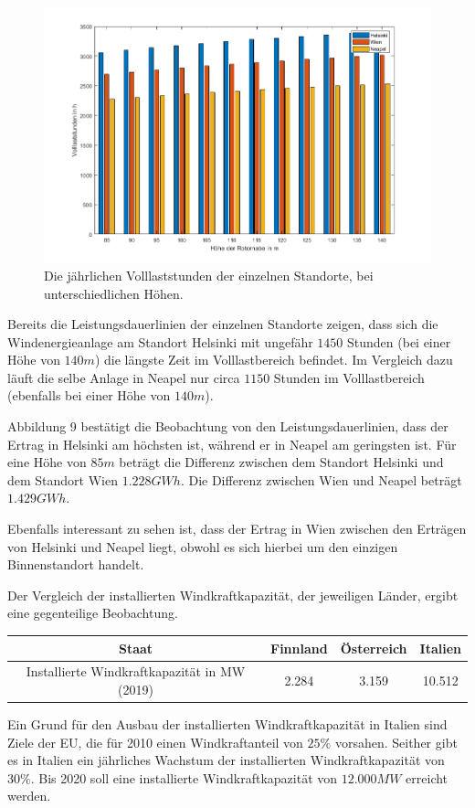 \documentclass[a4paper,12pt]{article}
\begin{document}
	\begin{figure}[H]
		\centering
		\includegraphics[width=12cm]{img/results/VolllaststundenEuropa}
		\caption{Die jährlichen Volllaststunden der einzelnen Standorte, bei unterschiedlichen Höhen.}
	\end{figure}
	\noindent Bereits die Leistungsdauerlinien der einzelnen Standorte zeigen, dass sich die Windenergieanlage am Standort Helsinki mit ungefähr $1450$ Stunden (bei einer Höhe von $140m$) die längste Zeit im Volllastbereich befindet. Im Vergleich dazu läuft die selbe Anlage in Neapel nur circa $1150$ Stunden im Volllastbereich (ebenfalls bei einer Höhe von $140m$).\\ \par
	\noindent Abbildung 9 bestätigt die Beobachtung von den Leistungsdauerlinien, dass der Ertrag in Helsinki am höchsten ist, während er in Neapel am geringsten ist.\newline
	Für eine Höhe von $85m$ beträgt die Differenz zwischen dem Standort Helsinki und dem Standort Wien $1.228GWh$. Die Differenz zwischen Wien und Neapel beträgt $1.429GWh$.\\ \par
	\noindent Ebenfalls interessant zu sehen ist, dass der Ertrag in Wien zwischen den Erträgen von Helsinki und Neapel liegt, obwohl es sich hierbei um den einzigen Binnenstandort handelt.\\ \par
	\noindent Der Vergleich der installierten Windkraftkapazität, der jeweiligen Länder, ergibt eine gegenteilige Beobachtung.
	\begin{table}[H]
		\centering
		\begin{tabular}{|c|c|c|c|}
			\hline
			Staat                                        & Finnland & Österreich & Italien \\ \hline
			Installierte Windkraftkapazität in MW (2019) & 2.284    & 3.159      & 10.512  \\ \hline
		\end{tabular}
	\end{table}
	\noindent Ein Grund für den Ausbau der installierten Windkraftkapazität in Italien sind Ziele der EU, die für 2010 einen Windkraftanteil von $25\%$ vorsahen. Seither gibt es in Italien ein jährliches Wachstum der installierten Windkraftkapazität von $30\%$. Bis 2020 soll eine installierte Windkraftkapazität von $12.000MW$ erreicht werden.
\end{document}
